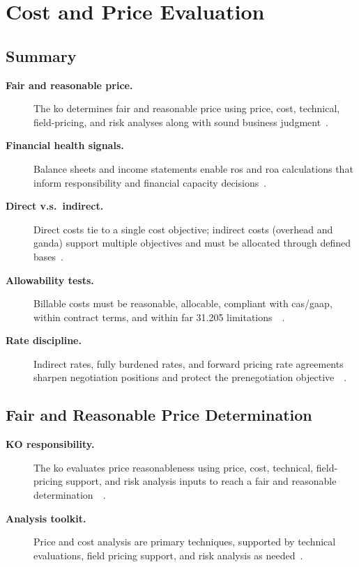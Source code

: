 \documentclass[../main.tex]{subfiles}
\begin{document}

\section{Cost and Price Evaluation}

\subsection{Summary}
\begin{description}
  \item[\textbf{Fair and reasonable price.}] The \ac{ko} determines fair and reasonable price using price, cost, technical, field-pricing, and risk analyses along with sound business judgment~\autocite{edo-3-2-4-cost-price-evaluation-2025}.
  \item[\textbf{Financial health signals.}] Balance sheets and income statements enable \ac{ros} and \ac{roa} calculations that inform responsibility and financial capacity decisions~\autocite{edo-3-2-4-cost-price-evaluation-2025}.
  \item[\textbf{Direct v.s.\ indirect.}] Direct costs tie to a single cost objective; indirect costs (overhead and \ac{ganda}) support multiple objectives and must be allocated through defined bases~\autocite{edo-3-2-4-cost-price-evaluation-2025}.
  \item[\textbf{Allowability tests.}] Billable costs must be reasonable, allocable, compliant with \ac{cas}/\ac{gaap}, within contract terms, and within \ac{far} 31.205 limitations~\autocite[\S~31.201-2]{FAR}~\autocite{edo-3-2-4-cost-price-evaluation-2025}.
  \item[\textbf{Rate discipline.}] Indirect rates, fully burdened rates, and forward pricing rate agreements sharpen negotiation positions and protect the prenegotiation objective~\autocite[\S~15.407-3]{FAR}~\autocite{edo-3-2-4-cost-price-evaluation-2025}.
\end{description}

\subsection{Fair and Reasonable Price Determination}
\begin{description}
  \item[\textbf{KO responsibility.}] The \ac{ko} evaluates price reasonableness using price, cost, technical, field-pricing support, and risk analysis inputs to reach a fair and reasonable determination~\autocite[\S~15.404-1(a)]{FAR}~\autocite{edo-3-2-4-cost-price-evaluation-2025}.
  \item[\textbf{Analysis toolkit.}] Price and cost analysis are primary techniques, supported by technical evaluations, field pricing support, and risk analysis as needed~\autocite{edo-3-2-4-cost-price-evaluation-2025}.
\end{description}
\end{document}
